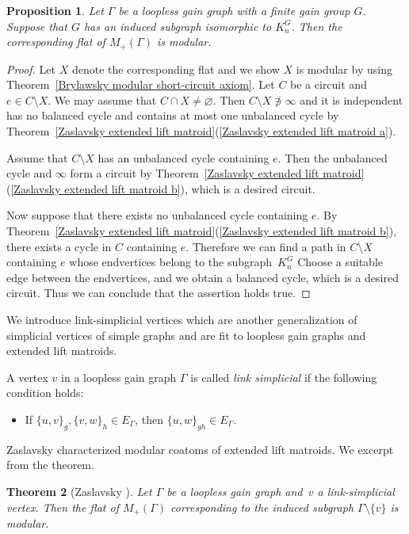 \documentclass[pdftex]{sigma}
\numberwithin{equation}{section}
\newtheorem{Theorem}{Theorem}[section]
\newtheorem{Proposition}[Theorem]{Proposition}
 { \theoremstyle{definition}
\newtheorem{Definition}[Theorem]{Definition}
\newtheorem{Example}[Theorem]{Example}
\newtheorem{Remark}[Theorem]{Remark}
\newtheorem{Question}[Theorem]{Question} }
\begin{document}
\begin{Proposition}\label{extended lift modular}
Let $ \Gamma $ be a loopless gain graph with a finite gain group $ G $.
Suppose that $ G $ has an induced subgraph isomorphic to $ K_{n}^{G} $.
Then the corresponding flat of $ M_{+}(\Gamma) $ is modular.
\end{Proposition}
\begin{proof}
Let $ X $ denote the corresponding flat and we show $ X $ is modular by using Theorem~\ref{Brylawsky modular short-circuit axiom}.
Let $ C $ be a circuit and $ e \in C \setminus X $.
We may assume that $ C \cap X \neq \varnothing $.
Then $ C\setminus X \not\ni \infty $ and it is independent has no balanced cycle and contains at most one unbalanced cycle by Theorem~\ref{Zaslavsky extended lift matroid}(\ref{Zaslavsky extended lift matroid a}).

Assume that $ C\setminus X $ has an unbalanced cycle containing $ e $.
Then the unbalanced cycle and $ \infty $ form a circuit by Theorem~\ref{Zaslavsky extended lift matroid}(\ref{Zaslavsky extended lift matroid b}), which is a desired circuit.

Now suppose that there exists no unbalanced cycle containing $ e $.
By Theorem~\ref{Zaslavsky extended lift matroid}(\ref{Zaslavsky extended lift matroid b}), there exists a cycle in $ C $ containing $ e $.
Therefore we can find a path in $ C\setminus X $ containing $ e $ whose endvertices belong to the subgraph~$ K_{n}^{G} $
Choose a suitable edge between the endvertices, and we obtain a balanced cycle, which is a desired circuit.
Thus we can conclude that the assertion holds true.
\end{proof}

We introduce link-simplicial vertices which are another generalization of simplicial vertices of simple graphs and are fit to loopless gain graphs and extended lift matroids.
\begin{Definition}
A vertex $ v $ in a loopless gain graph $ \Gamma $ is called \textit{link simplicial} if the following condition holds:
\begin{itemize}\itemsep=0pt
\item If $ \{u,v\}_{g}, \{v,w\}_{h} \in E_{\Gamma} $, then $ \{u,w\}_{gh} \in E_{\Gamma} $.
\end{itemize}
\end{Definition}

Zaslavsky characterized modular coatoms of extended lift matroids.
We excerpt from the theorem.
\begin{Theorem}[{Zaslavsky \cite[Theorem~3.1]{zaslavsky2001supersolvable-ejoc}}]\label{Zaslavsky link simplicial}
Let $ \Gamma $ be a loopless gain graph and~$ v $ a link-simplicial vertex.
Then the flat of $ M_{+}(\Gamma) $ corresponding to the induced subgraph $ \Gamma \setminus \{v\} $ is modular.
\end{Theorem}
\end{document}
